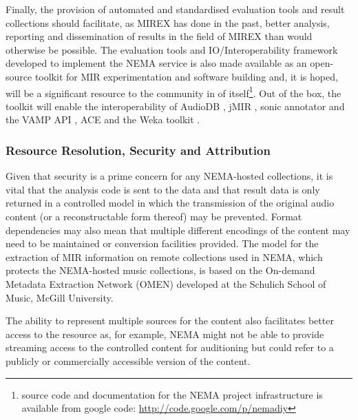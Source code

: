 \documentclass[conference]{IEEEtran}
\begin{document}
Finally, the provision of automated and standardised evaluation tools and result collections should facilitate, as MIREX has done in the past, better analysis, reporting and dissemination of results in the field of MIREX than would otherwise be possible.
The evaluation tools and IO/Interoperability framework developed to implement the NEMA service is also made available as an open-source toolkit for MIR experimentation and software building and, it is hoped, will be a significant resource to the community in of itself\footnote{source code and documentation for the NEMA project infrastructure is available from google code: \url{http://code.google.com/p/nemadiy}}. 
Out of the box, the toolkit will enable the interoperability of AudioDB \cite{casey2008audiodb}, jMIR \cite{mckay2009jmir}, sonic annotator and the VAMP API \cite{cannam2006sonic}, ACE \cite{mckay2005ace} and the Weka toolkit \cite{witten1999wpm}.  


\subsubsection{Resource Resolution, Security and Attribution}
Given that security is a prime concern for any NEMA-hosted collections, it is vital that the analysis code is sent to the data and that result data is only returned in a controlled model in which the transmission of the original audio content (or a reconstructable form thereof) may be prevented. Format dependencies may also mean that multiple different encodings of the content may need to be maintained or conversion facilities provided. 
The model for the extraction of MIR information on remote collections used in NEMA, which protects the NEMA-hosted music collections, is based on the On-demand Metadata Extraction Network (OMEN) \cite{mcennis2006overview} developed at the Schulich School of Music, McGill University.

The ability to represent multiple sources for the content also facilitates better access to the resource as, for example, NEMA might not be able to provide streaming access to the controlled content for auditioning but could refer to a publicly or commercially accessible version of the content. \\
\end{document}
